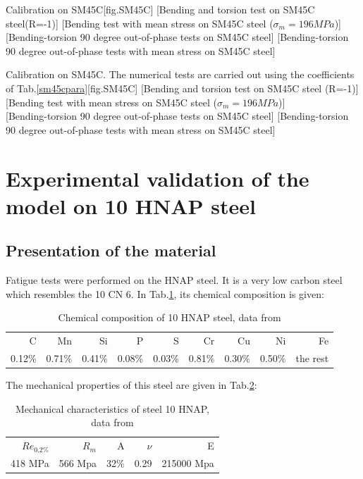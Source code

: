 \documentclass[3p,times,procedia,number]{elsarticle}
\begin{document}
\begin{Figure}[!h]{Calibration on  SM45C}[fig.SM45C]
	[Bending and torsion test on SM45C steel(R=-1)]
	[Bending test with mean stress on SM45C steel ($\sigma_m=196 MPa$)]
	\\
	[Bending-torsion 90 degree out-of-phase tests on SM45C steel]
	[Bending-torsion 90 degree out-of-phase tests with mean stress on SM45C steel]
\end{Figure}

\begin{Figure}[!h]{Calibration on  SM45C. The numerical tests are carried out using the coefficients of Tab.\ref{sm45cpara}}[fig.SM45C]
	[Bending and torsion test on SM45C steel (R=-1)]
	[Bending test with mean stress on SM45C steel ($\sigma_m=196 MPa$)]
	\\
	[Bending-torsion 90 degree out-of-phase tests on SM45C steel]
	[Bending-torsion 90 degree out-of-phase tests with mean stress on SM45C steel]
\end{Figure}


\clearpage
\section{Experimental validation of the model on 10 HNAP steel}
\subsection{Presentation of the material}
Fatigue tests were performed on the HNAP steel. It is a very low carbon steel
which resembles the 10 CN 6. In Tab.\ref{tab.10HNAPchem}, its chemical composition is given:	
\begin{table}[!h]
	\centering
	\begin{tabular}{rrrrrrrrr}
		\hline
		C      & Mn     & Si     & P      & S      & Cr     & Cu     & Ni     & Fe       \\
		0.12\% & 0.71\% & 0.41\% & 0.08\% & 0.03\% & 0.81\% & 0.30\% & 0.50\% & the rest \\ \hline
	\end{tabular}
	\caption{Chemical composition of 10 HNAP steel, data from \cite{Bedkowski1994}}
	\label{tab.10HNAPchem}
\end{table}
The mechanical properties of this steel are given in Tab.\ref{tab.10HNAPmec}:
\begin{table}[!h]
	\centering
	\begin{tabular}{rrrrr}
		\hline
		$Re_{0.2\%}$ & $R_m$   & A    & $\nu$ & E          \\
		418 MPa     & 566 Mpa & 32\% & 0.29  & 215000 Mpa \\ \hline
	\end{tabular}
	\caption{Mechanical characteristics of steel 10 HNAP, data from \cite{Bedkowski1994}}
	\label{tab.10HNAPmec}
\end{table}
\end{document}
